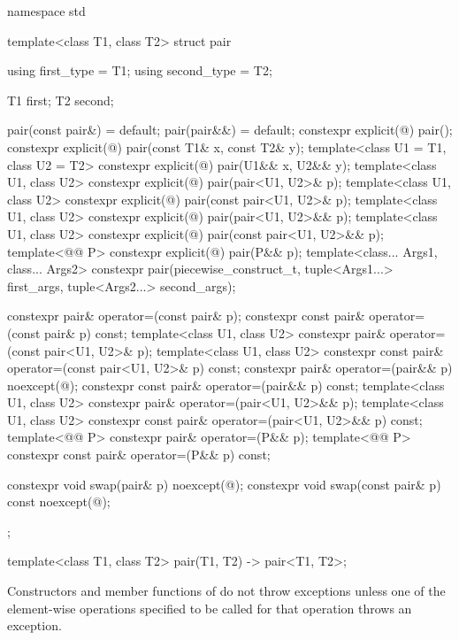 %
\begin{codeblock}
namespace std {
  template<class T1, class T2>
  struct pair {
    using first_type  = T1;
    using second_type = T2;

    T1 first;
    T2 second;

    pair(const pair&) = default;
    pair(pair&&) = default;
    constexpr explicit(@\seebelow@) pair();
    constexpr explicit(@\seebelow@) pair(const T1& x, const T2& y);
    template<class U1 = T1, class U2 = T2>
      constexpr explicit(@\seebelow@) pair(U1&& x, U2&& y);
    template<class U1, class U2>
      constexpr explicit(@\seebelow@) pair(pair<U1, U2>& p);
    template<class U1, class U2>
      constexpr explicit(@\seebelow@) pair(const pair<U1, U2>& p);
    template<class U1, class U2>
      constexpr explicit(@\seebelow@) pair(pair<U1, U2>&& p);
    template<class U1, class U2>
      constexpr explicit(@\seebelow@) pair(const pair<U1, U2>&& p);
    template<@@ P>
      constexpr explicit(@\seebelow@) pair(P&& p);
    template<class... Args1, class... Args2>
      constexpr pair(piecewise_construct_t,
                     tuple<Args1...> first_args, tuple<Args2...> second_args);

    constexpr pair& operator=(const pair& p);
    constexpr const pair& operator=(const pair& p) const;
    template<class U1, class U2>
      constexpr pair& operator=(const pair<U1, U2>& p);
    template<class U1, class U2>
      constexpr const pair& operator=(const pair<U1, U2>& p) const;
    constexpr pair& operator=(pair&& p) noexcept(@\seebelow@);
    constexpr const pair& operator=(pair&& p) const;
    template<class U1, class U2>
      constexpr pair& operator=(pair<U1, U2>&& p);
    template<class U1, class U2>
      constexpr const pair& operator=(pair<U1, U2>&& p) const;
    template<@@ P>
      constexpr pair& operator=(P&& p);
    template<@@ P>
      constexpr const pair& operator=(P&& p) const;

    constexpr void swap(pair& p) noexcept(@\seebelow@);
    constexpr void swap(const pair& p) const noexcept(@\seebelow@);
  };

  template<class T1, class T2>
    pair(T1, T2) -> pair<T1, T2>;
}
\end{codeblock}

\pnum
Constructors and member functions of  do not throw exceptions unless one of
the element-wise operations specified to be called for that operation
throws an exception.


